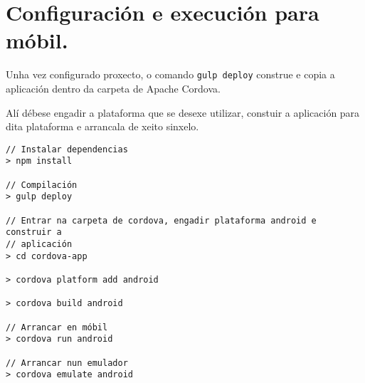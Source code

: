   \section{Configuración e execución para móbil.}

  Unha vez configurado proxecto, o comando \lstinline{gulp deploy} construe 
e copia a aplicación dentro da carpeta de Apache Cordova.

  Alí débese engadir a plataforma que se desexe utilizar, constuir a 
aplicación para dita plataforma e arrancala de xeito sinxelo.

    \lstset{}
    \begin{lstlisting}[caption=Configuración e execución móbil]
// Instalar dependencias
> npm install

// Compilación
> gulp deploy

// Entrar na carpeta de cordova, engadir plataforma android e construir a 
// aplicación
> cd cordova-app

> cordova platform add android

> cordova build android

// Arrancar en móbil
> cordova run android

// Arrancar nun emulador
> cordova emulate android

    \end{lstlisting}

\thispagestyle{empty}
